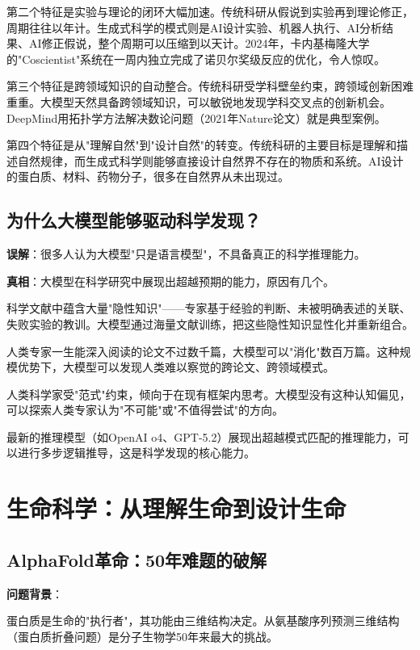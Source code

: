 第二个特征是实验与理论的闭环大幅加速。传统科研从假说到实验再到理论修正，周期往往以年计。生成式科学的模式则是AI设计实验、机器人执行、AI分析结果、AI修正假说，整个周期可以压缩到以天计。2024年，卡内基梅隆大学的"Coscientist"系统在一周内独立完成了诺贝尔奖级反应的优化，令人惊叹。

第三个特征是跨领域知识的自动整合。传统科研受学科壁垒约束，跨领域创新困难重重。大模型天然具备跨领域知识，可以敏锐地发现学科交叉点的创新机会。DeepMind用拓扑学方法解决数论问题（2021年Nature论文）就是典型案例。

第四个特征是从"理解自然"到"设计自然"的转变。传统科研的主要目标是理解和描述自然规律，而生成式科学则能够直接设计自然界不存在的物质和系统。AI设计的蛋白质、材料、药物分子，很多在自然界从未出现过。

\subsection{为什么大模型能够驱动科学发现？}

\textbf{误解}：很多人认为大模型"只是语言模型"，不具备真正的科学推理能力。

\textbf{真相}：大模型在科学研究中展现出超越预期的能力，原因有几个。

科学文献中蕴含大量"隐性知识"——专家基于经验的判断、未被明确表述的关联、失败实验的教训。大模型通过海量文献训练，把这些隐性知识显性化并重新组合。

人类专家一生能深入阅读的论文不过数千篇，大模型可以"消化"数百万篇。这种规模优势下，大模型可以发现人类难以察觉的跨论文、跨领域模式。

人类科学家受"范式"约束，倾向于在现有框架内思考。大模型没有这种认知偏见，可以探索人类专家认为"不可能"或"不值得尝试"的方向。

最新的推理模型（如OpenAI o4、GPT-5.2）展现出超越模式匹配的推理能力，可以进行多步逻辑推导，这是科学发现的核心能力。

\section{生命科学：从理解生命到设计生命}

\subsection{AlphaFold革命：50年难题的破解}

\textbf{问题背景}：

蛋白质是生命的"执行者"，其功能由三维结构决定。从氨基酸序列预测三维结构（蛋白质折叠问题）是分子生物学50年来最大的挑战。

